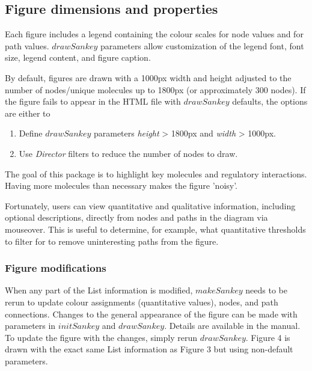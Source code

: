 \documentclass[a4paper]{article}
\begin{document}
    \subsection{Figure dimensions and properties}
Each figure includes a legend containing the colour scales for node values and for path values. $drawSankey$ parameters allow customization of the legend font, font size, legend content, and figure caption.

By default, figures are drawn with a 1000px width and height adjusted to the number of nodes/unique molecules up to 1800px (or approximately 300 nodes). If the figure fails to appear in the HTML file with $drawSankey$ defaults, the options are either to
\begin{enumerate}
    \item Define $drawSankey$ parameters \textit{height} > 1800px and \textit{width} > 1000px.
    \item Use \textit{Director} filters to reduce the number of nodes to draw.
\end{enumerate}

The goal of this package is to highlight key molecules and regulatory interactions. Having more molecules than necessary makes the figure 'noisy'.

Fortunately, users can view quantitative and qualitative information, including optional descriptions, directly from nodes and paths in the diagram via mouseover. This is useful to determine, for example, what quantitative thresholds to filter for to remove uninteresting paths from the figure.

    \subsubsection{Figure modifications}
    \label{sec:figMods}
When any part of the List information is modified, $makeSankey$ needs to be rerun to update colour assignments (quantitative values), nodes, and path connections. Changes to the general appearance of the figure can be made with parameters in $initSankey$ and $drawSankey$. Details are available in the manual. To update the figure with the changes, simply rerun $drawSankey$. Figure 4 is drawn with the exact same List information as Figure 3 but using non-default parameters.

\begin{Schunk}
\end{Schunk}
\end{document}
